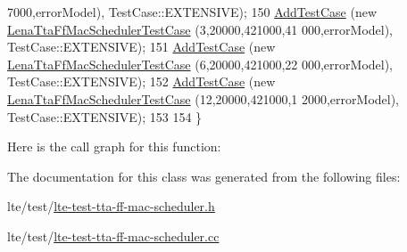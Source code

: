 \begin{DoxyCode}
      7000,errorModel), TestCase::EXTENSIVE);
150   \hyperlink{classns3_1_1TestCase_a3718088e3eefd5d6454569d2e0ddd835}{AddTestCase} (\textcolor{keyword}{new} \hyperlink{classLenaTtaFfMacSchedulerTestCase}{LenaTtaFfMacSchedulerTestCase} (3,20000,421000,41
      000,errorModel), TestCase::EXTENSIVE);
151   \hyperlink{classns3_1_1TestCase_a3718088e3eefd5d6454569d2e0ddd835}{AddTestCase} (\textcolor{keyword}{new} \hyperlink{classLenaTtaFfMacSchedulerTestCase}{LenaTtaFfMacSchedulerTestCase} (6,20000,421000,22
      000,errorModel), TestCase::EXTENSIVE);
152   \hyperlink{classns3_1_1TestCase_a3718088e3eefd5d6454569d2e0ddd835}{AddTestCase} (\textcolor{keyword}{new} \hyperlink{classLenaTtaFfMacSchedulerTestCase}{LenaTtaFfMacSchedulerTestCase} (12,20000,421000,1
      2000,errorModel), TestCase::EXTENSIVE);
153 
154 \}
\end{DoxyCode}


Here is the call graph for this function\+:




The documentation for this class was generated from the following files\+:\begin{DoxyCompactItemize}
\item 
lte/test/\hyperlink{lte-test-tta-ff-mac-scheduler_8h}{lte-\/test-\/tta-\/ff-\/mac-\/scheduler.\+h}\item 
lte/test/\hyperlink{lte-test-tta-ff-mac-scheduler_8cc}{lte-\/test-\/tta-\/ff-\/mac-\/scheduler.\+cc}\end{DoxyCompactItemize}
